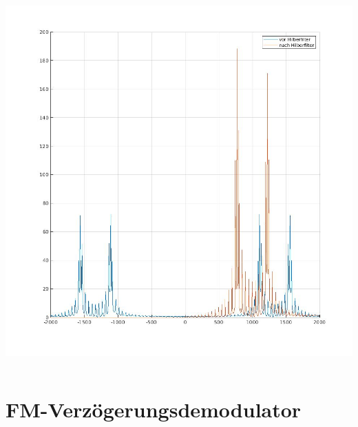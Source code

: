 \documentclass{beamer}
\begin{document}
{\begin{columns}
\begin{column}{0.5\textwidth}
      \includegraphics[height=0.6\textheight]{images/hilber_vgl.jpg}
    \end{column}
  \end{columns}
}

\section{FM-Verzögerungsdemodulator}
\end{document}
